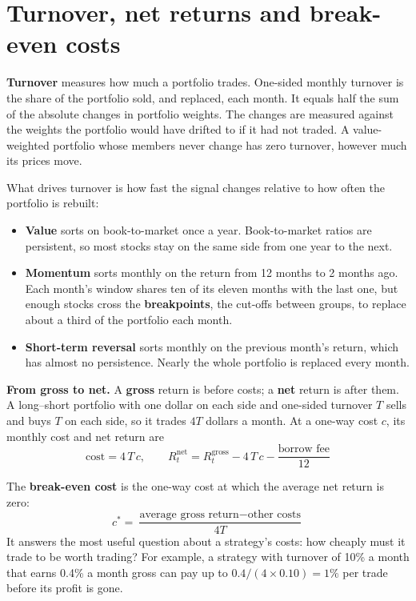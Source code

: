 \section{Turnover, net returns and break-even costs}
\label{sec:17-turnover}

\textbf{Turnover} measures how much a portfolio trades. One-sided monthly turnover is the share of the portfolio sold, and replaced, each month. It equals half the sum of the absolute changes in portfolio weights. The changes are measured against the weights the portfolio would have drifted to if it had not traded. A value-weighted portfolio whose members never change has zero turnover, however much its prices move.

What drives turnover is how fast the signal changes relative to how often the portfolio is rebuilt:

\begin{itemize}
  \item \textbf{Value} sorts on book-to-market once a year. Book-to-market ratios are persistent, so most stocks stay on the same side from one year to the next.
  \item \textbf{Momentum} sorts monthly on the return from 12 months to 2 months ago. Each month's window shares ten of its eleven months with the last one, but enough stocks cross the \textbf{breakpoints}, the cut-offs between groups, to replace about a third of the portfolio each month.
  \item \textbf{Short-term reversal} sorts monthly on the previous month's return, which has almost no persistence. Nearly the whole portfolio is replaced every month.
\end{itemize}

\textbf{From gross to net.} A \textbf{gross} return is before costs; a \textbf{net} return is after them. A long--short portfolio with one dollar on each side and one-sided turnover $T$ sells and buys $T$ on each side, so it trades $4T$ dollars a month. At a one-way cost $c$, its monthly cost and net return are
\begin{equation}
  \text{cost} = 4\,T\,c, \qquad R^{\text{net}}_t = R^{\text{gross}}_t - 4\,T\,c - \frac{\text{borrow fee}}{12}
  \label{eq:17-net}
\end{equation}

The \textbf{break-even cost} is the one-way cost at which the average net return is zero:
\begin{equation}
  c^* = \frac{\text{average gross return} - \text{other costs}}{4T}
  \label{eq:17-breakeven}
\end{equation}
It answers the most useful question about a strategy's costs: how cheaply must it trade to be worth trading? For example, a strategy with turnover of 10\% a month that earns 0.4\% a month gross can pay up to $0.4/(4 \times 0.10) = 1\%$ per trade before its profit is gone.

